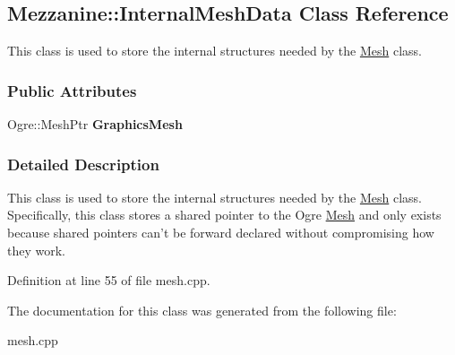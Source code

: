 \hypertarget{classMezzanine_1_1InternalMeshData}{
\subsection{Mezzanine::InternalMeshData Class Reference}
\label{classMezzanine_1_1InternalMeshData}
}


This class is used to store the internal structures needed by the \hyperlink{classMezzanine_1_1Mesh}{Mesh} class.  


\subsubsection*{Public Attributes}
\begin{DoxyCompactItemize}
\item 
\hypertarget{classMezzanine_1_1InternalMeshData_aefe57342f8cc5c8f48fc59c2bed9bd58}{
Ogre::MeshPtr {\bfseries GraphicsMesh}}
\label{classMezzanine_1_1InternalMeshData_aefe57342f8cc5c8f48fc59c2bed9bd58}

\end{DoxyCompactItemize}


\subsubsection{Detailed Description}
This class is used to store the internal structures needed by the \hyperlink{classMezzanine_1_1Mesh}{Mesh} class. Specifically, this class stores a shared pointer to the Ogre \hyperlink{classMezzanine_1_1Mesh}{Mesh} and only exists because shared pointers can't be forward declared without compromising how they work. 

Definition at line 55 of file mesh.cpp.



The documentation for this class was generated from the following file:\begin{DoxyCompactItemize}
\item 
mesh.cpp\end{DoxyCompactItemize}
